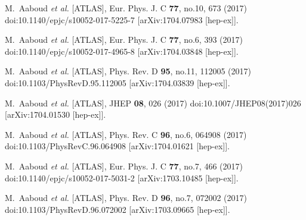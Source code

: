 \begin{thebibliography}{9}
M.~Aaboud \textit{et al.} [ATLAS],
Eur. Phys. J. C \textbf{77}, no.10, 673 (2017)
doi:10.1140/epjc/s10052-017-5225-7
[arXiv:1704.07983 [hep-ex]].

M.~Aaboud \textit{et al.} [ATLAS],
Eur. Phys. J. C \textbf{77}, no.6, 393 (2017)
doi:10.1140/epjc/s10052-017-4965-8
[arXiv:1704.03848 [hep-ex]].

M.~Aaboud \textit{et al.} [ATLAS],
Phys. Rev. D \textbf{95}, no.11, 112005 (2017)
doi:10.1103/PhysRevD.95.112005
[arXiv:1704.03839 [hep-ex]].

M.~Aaboud \textit{et al.} [ATLAS],
JHEP \textbf{08}, 026 (2017)
doi:10.1007/JHEP08(2017)026
[arXiv:1704.01530 [hep-ex]].

M.~Aaboud \textit{et al.} [ATLAS],
Phys. Rev. C \textbf{96}, no.6, 064908 (2017)
doi:10.1103/PhysRevC.96.064908
[arXiv:1704.01621 [hep-ex]].

M.~Aaboud \textit{et al.} [ATLAS],
Eur. Phys. J. C \textbf{77}, no.7, 466 (2017)
doi:10.1140/epjc/s10052-017-5031-2
[arXiv:1703.10485 [hep-ex]].

M.~Aaboud \textit{et al.} [ATLAS],
Phys. Rev. D \textbf{96}, no.7, 072002 (2017)
doi:10.1103/PhysRevD.96.072002
[arXiv:1703.09665 [hep-ex]].


\end{thebibliography}
